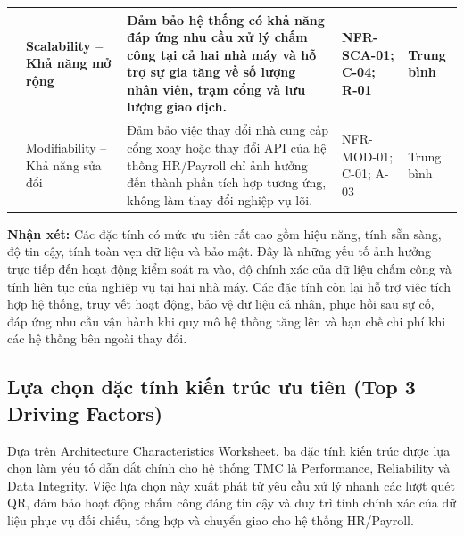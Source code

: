 \begin{longtable}{|>{\centering\arraybackslash}p{0.65cm}|>{\raggedright\arraybackslash}p{2.4cm}|>{\raggedright\arraybackslash}p{4.7cm}|>{\raggedright\arraybackslash}p{3.5cm}|>{\centering\arraybackslash}p{1.8cm}|}
\hline
10 & Scalability -- Khả năng mở rộng & Đảm bảo hệ thống có khả năng đáp ứng nhu cầu xử lý chấm công tại cả hai nhà máy và hỗ trợ sự gia tăng về số lượng nhân viên, trạm cổng và lưu lượng giao dịch. & NFR-SCA-01; C-04; R-01 & Trung bình \\
\hline
11 & Modifiability -- Khả năng sửa đổi & Đảm bảo việc thay đổi nhà cung cấp cổng xoay hoặc thay đổi API của hệ thống HR/Payroll chỉ ảnh hưởng đến thành phần tích hợp tương ứng, không làm thay đổi nghiệp vụ lõi. & NFR-MOD-01; C-01; A-03 & Trung bình \\
\end{longtable}
\normalsize

\noindent\textbf{Nhận xét:} Các đặc tính có mức ưu tiên rất cao gồm hiệu năng, tính sẵn sàng, độ tin cậy, tính toàn vẹn dữ liệu và bảo mật. Đây là những yếu tố ảnh hưởng trực tiếp đến hoạt động kiểm soát ra vào, độ chính xác của dữ liệu chấm công và tính liên tục của nghiệp vụ tại hai nhà máy. Các đặc tính còn lại hỗ trợ việc tích hợp hệ thống, truy vết hoạt động, bảo vệ dữ liệu cá nhân, phục hồi sau sự cố, đáp ứng nhu cầu vận hành khi quy mô hệ thống tăng lên và hạn chế chi phí khi các hệ thống bên ngoài thay đổi.

\subsection{Lựa chọn đặc tính kiến trúc ưu tiên (Top 3 Driving Factors)}\label{sec:top3}

Dựa trên Architecture Characteristics Worksheet, ba đặc tính kiến trúc được lựa chọn làm yếu tố dẫn dắt chính cho hệ thống TMC là Performance, Reliability và Data Integrity. Việc lựa chọn này xuất phát từ yêu cầu xử lý nhanh các lượt quét QR, đảm bảo hoạt động chấm công đáng tin cậy và duy trì tính chính xác của dữ liệu phục vụ đối chiếu, tổng hợp và chuyển giao cho hệ thống HR/Payroll.

